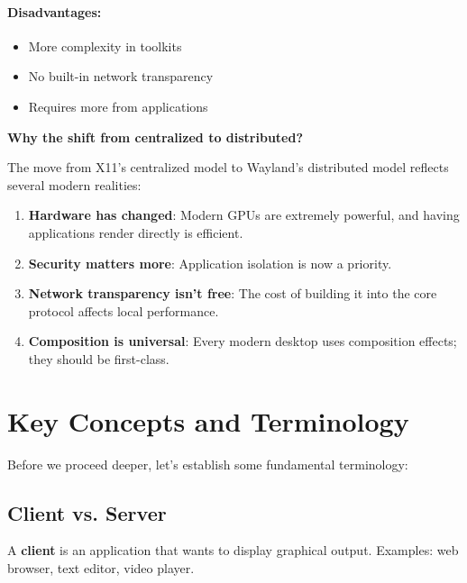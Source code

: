 \paragraph{Disadvantages:}
\begin{itemize}[leftmargin=*]
    \item More complexity in toolkits
    \item No built-in network transparency
    \item Requires more from applications
\end{itemize}

\begin{designbox}
\textbf{Why the shift from centralized to distributed?}

The move from X11's centralized model to Wayland's distributed model reflects several modern realities:

\begin{enumerate}
    \item \textbf{Hardware has changed}: Modern GPUs are extremely powerful, and having applications render directly is efficient.
    \item \textbf{Security matters more}: Application isolation is now a priority.
    \item \textbf{Network transparency isn't free}: The cost of building it into the core protocol affects local performance.
    \item \textbf{Composition is universal}: Every modern desktop uses composition effects; they should be first-class.
\end{enumerate}
\end{designbox}

\section{Key Concepts and Terminology}

Before we proceed deeper, let's establish some fundamental terminology:

\subsection{Client vs. Server}

\begin{definition}[Client]
A \textbf{client} is an application that wants to display graphical output. Examples: web browser, text editor, video player.
\end{definition}

